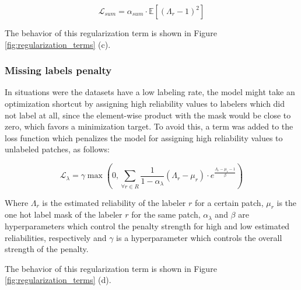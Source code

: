 \begin{equation}
  \mathcal{L}_{sum} = \alpha_{sum} \cdot
  \mathbb{E}[( \Lambda_r - 1)^2]
\end{equation}

The behavior of this regularization term is shown in Figure
\ref{fig:regularization_terms} (c).

\subsubsection{Missing labels penalty}
In situations were the datasets have a low labeling rate, the model might
take an optimization shortcut by assigning high reliability values to
labelers which did not label at all, since the element-wise product with the
mask would be close to zero, which favors a minimization target.
To avoid this, a term was added to the loss function which penalizes
the model for assigning high reliability values to unlabeled patches,
as follows:

\begin{equation}
  \mathcal{L}_{\lambda} = \gamma \max \left(0, \sum_{\forall r \in R}
    \frac{1}{1-\alpha_{\lambda}} \left(\Lambda_r - \mu_r\right) \cdot
  e^{\frac{\Lambda_r - \mu_r - 1}{\beta}}\right)
\end{equation}

Where $\Lambda_r$ is the estimated reliability of the labeler $r$ for a
certain patch, $\mu_r$ is the one hot label mask of the labeler
$r$ for the same patch, $\alpha_{\lambda}$ and $\beta$ are hyperparameters
which control the penalty strength for high and low estimated
reliabilities, respectively and $\gamma$ is a hyperparameter
which controls the overall strength of the penalty.

The behavior of this regularization term is shown in Figure
\ref{fig:regularization_terms} (d).

